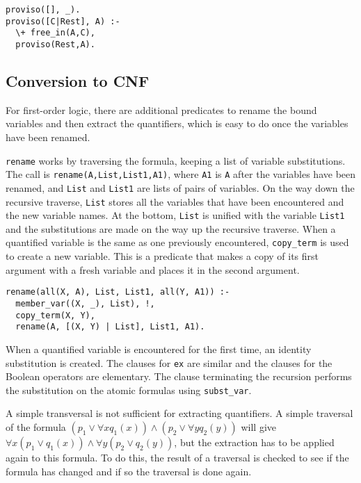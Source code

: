 \documentclass[11pt]{article}
\newcommand*{\p}[1]{\textup{\texttt{#1}}}
\begin{document}
\begin{verbatim}
proviso([], _).
proviso([C|Rest], A) :-
  \+ free_in(A,C),
  proviso(Rest,A).
\end{verbatim}




\subsection{Conversion to CNF}

For first-order logic, there are additional predicates to rename the
bound variables and then extract the quantifiers, which is easy to do
once the variables have been renamed.

\p{rename} works by traversing the formula, keeping a list of variable
substitutions. The call is \p{rename(A,List,List1,A1)}, where \p{A1} is
\p{A} after the variables have been renamed, and \p{List} and \p{List1}
are lists of pairs of variables. On the way down the recursive traverse,
\p{List} stores all the variables that have been encountered and the new
variable names. At the bottom, \p{List} is unified with the variable
\p{List1} and the substitutions are made on the way up the recursive
traverse. When a quantified variable is the same as one previously
encountered, \p{copy\_term} is used to create a new variable. This is a
predicate that makes a copy of its first argument with a fresh variable
and places it in the second argument.

\begin{verbatim}
rename(all(X, A), List, List1, all(Y, A1)) :-
  member_var((X, _), List), !,
  copy_term(X, Y),
  rename(A, [(X, Y) | List], List1, A1).
\end{verbatim}

When a quantified variable is encountered for the first time, an
identity substitution is created. The clauses for \p{ex} are similar and
the clauses for the Boolean operators are elementary. The clause
terminating the recursion performs the substitution on the atomic
formulas using \p{subst\_var}.

A simple transversal is not sufficient for extracting quantifiers. A
simple traversal of the formula $(p_{1} \vee \forall xq_{1}(x)) \wedge
(p_{2} \vee \forall yq_{2}(y))$ will give $\forall x(p_{1} \vee
q_{1}(x)) \wedge \forall y(p_{2} \vee q_{2}(y))$, but the extraction has
to be applied again to this formula. To do this, the result of a
traversal is checked to see if the formula has changed and if so the
traversal is done again.
\end{document}

